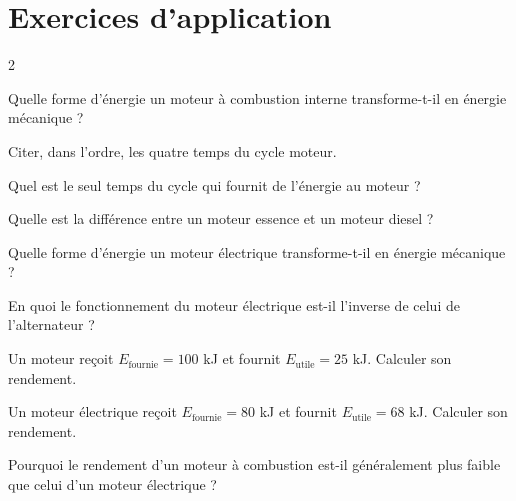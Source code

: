 \section{Exercices d'application}
\begin{multicols}{2}

\exo{} Quelle forme d'énergie un moteur à combustion interne transforme-t-il en
énergie mécanique ?

\exo{} Citer, dans l'ordre, les quatre temps du cycle moteur.

\exo{} Quel est le seul temps du cycle qui fournit de l'énergie au moteur ?

\exo{} Quelle est la différence entre un moteur essence et un moteur diesel ?

\exo{} Quelle forme d'énergie un moteur électrique transforme-t-il en énergie
mécanique ?

\exo{} En quoi le fonctionnement du moteur électrique est-il l'inverse de celui
de l'alternateur ?

\exo{} Un moteur reçoit $E_{\text{fournie}}=100$ kJ et fournit
$E_{\text{utile}}=25$ kJ. Calculer son rendement.

\exo{} Un moteur électrique reçoit $E_{\text{fournie}}=80$ kJ et fournit
$E_{\text{utile}}=68$ kJ. Calculer son rendement.

\exo{} Pourquoi le rendement d'un moteur à combustion est-il généralement plus
faible que celui d'un moteur électrique ?

\end{multicols}

